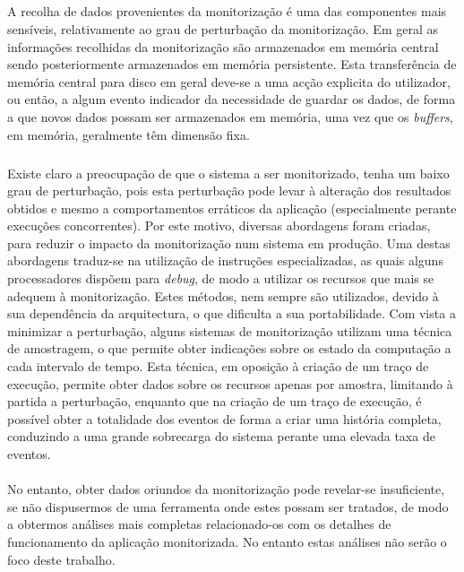 \subparagraph*{
}
A recolha de dados provenientes da monitorização é uma das componentes mais sensíveis, relativamente ao grau de perturbação da monitorização.
Em geral as informações recolhidas da monitorização são armazenados em memória central sendo posteriormente armazenados em memória persistente.
Esta transferência de memória central para disco em geral deve-se a uma acção explicita do utilizador, ou então, a algum evento indicador da necessidade de guardar os dados, de forma a que novos dados possam ser armazenados em memória, uma vez que os \textit{buffers}, em memória, geralmente têm dimensão fixa.

\subparagraph*{
}
Existe claro a preocupação de que o sistema a ser monitorizado, tenha um baixo grau de perturbação, pois esta perturbação pode levar à alteração dos resultados obtidos e mesmo a comportamentos erráticos da aplicação (especialmente perante execuções concorrentes).
Por este motivo, diversas abordagens foram criadas, para reduzir o impacto da monitorização num sistema em produção.
Uma destas abordagens traduz-se na utilização de instruções especializadas, as quais alguns processadores dispõem para \textit{debug}, de modo a utilizar os recursos que mais se adequem à monitorização.
Estes métodos, nem sempre são utilizados, devido à sua dependência da arquitectura, o que dificulta a sua portabilidade.
Com vista a minimizar a perturbação, alguns sistemas de monitorização utilizam uma técnica de amostragem, o que permite obter indicações sobre os estado da computação a cada intervalo de tempo.
Esta técnica, em oposição à criação de um traço de execução, permite obter dados sobre os recursos apenas por amostra, limitando à partida a perturbação, enquanto que na criação de um traço de execução, é possível obter a totalidade dos eventos de forma a criar uma história completa, conduzindo a uma grande sobrecarga do sistema perante uma elevada taxa de eventos.

\paragraph*{
}
No entanto, obter dados oriundos da monitorização pode revelar-se insuficiente, se não dispusermos de uma ferramenta onde estes possam ser tratados, de modo a obtermos análises mais completas relacionado-os com os detalhes de funcionamento da aplicação monitorizada.
No entanto estas análises não serão o foco deste trabalho.

